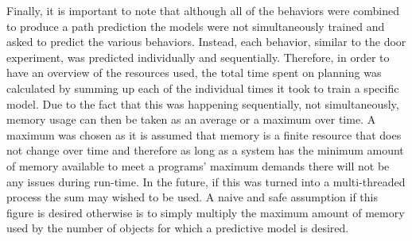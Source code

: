 Finally, it is important to note that although all of the behaviors were
combined to produce a path prediction the models were not simultaneously
trained and asked to predict the various behaviors. Instead, each behavior,
similar to the door experiment, was predicted individually and sequentially.
Therefore, in order to have an overview of the resources used, the total
time spent on planning was calculated by summing up each of the individual
times it took to train a specific model. Due to the fact that this was happening
sequentially, not simultaneously, memory usage can then be taken as an
average or a maximum over time. A maximum was chosen as it is assumed that
memory is a finite resource that does not change over time and therefore as long
as a system has the minimum amount of memory available to meet a programs'
maximum demands there will not be any issues during run-time.
In the future, if this was turned into a multi-threaded process the sum may wished to be used.
A naive and safe assumption if this figure is desired otherwise is to simply
multiply the maximum amount of memory used by the number of objects for which
a predictive model is desired. \\

\begin{table}[htb!]
  \centering
  \caption{Historical Path Planning Results}
  \label{table:Historical_Path_Planning_Results}
\end{table}

